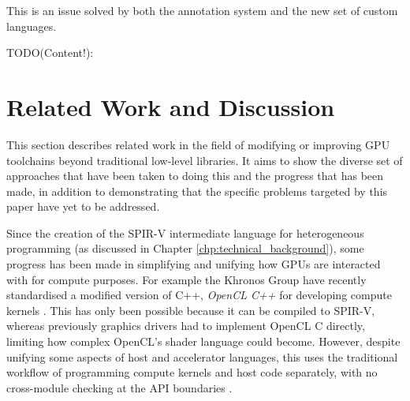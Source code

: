 \documentclass[a4paper,12pt,twoside,openright]{report}
\begin{document}
This is an issue solved by both the annotation system and the new set of custom
languages.

TODO(Content!):





\chapter{Related Work and Discussion}


\label{chp:related_work}

This section describes related work in the field of modifying or improving GPU
toolchains beyond traditional low-level libraries. It aims to show the diverse
set of approaches that have been taken to doing this and the progress that has
been made, in addition to demonstrating that the specific problems targeted by
this paper have yet to be addressed.

Since the creation of the SPIR-V intermediate language for heterogeneous
programming (as discussed in Chapter \ref{chp:technical_background}), some
progress has been made in simplifying and unifying how GPUs are interacted with
for compute purposes. For example the Khronos Group have recently standardised
a modified version of C++, \textit{OpenCL C++} for developing compute kernels
\cite{OpenCL22Release} \cite{OpenCLCPPWhitePaper} \cite{OpenCL}. This has only
been possible because it can be compiled to SPIR-V, whereas previously graphics
drivers had to implement OpenCL C directly, limiting how complex OpenCL's
shader language could become. However, despite unifying some aspects of host
and accelerator languages, this uses the traditional workflow of programming
compute kernels and host code separately, with no cross-module checking at the
API boundaries \cite{OpenCL22Release}.
\end{document}
